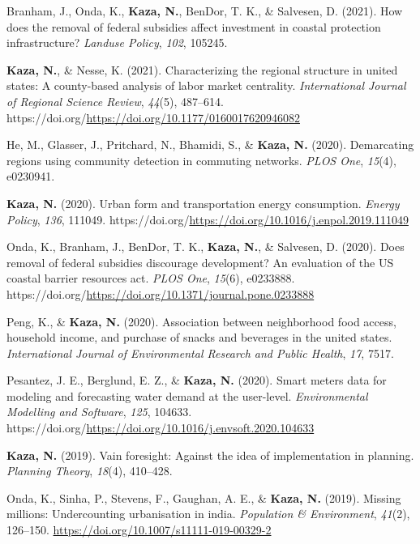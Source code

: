 \documentclass[11pt,a4paper,]{awesome-cv}
\newlength{\cslhangindent}
\newenvironment{CSLReferences}[2] %
 {\begin{list}{}{%
  \setlength{\itemindent}{0pt}
  \setlength{\leftmargin}{0pt}
  \setlength{\parsep}{0pt}
  \ifodd #1
   \setlength{\leftmargin}{\cslhangindent}
   \setlength{\itemindent}{-1\cslhangindent}
  \fi
  \setlength{\itemsep}{#2\baselineskip}}}
 {\end{list}}
\begin{document}
\begin{CSLReferences}{1}{0}
Branham, J., Onda, K., \textbf{Kaza, N.}, BenDor, T. K., \& Salvesen, D.
(2021). How does the removal of federal subsidies affect investment in
coastal protection infrastructure? \emph{Landuse Policy}, \emph{102},
105245.

\textbf{Kaza, N.}, \& Nesse, K. (2021). Characterizing the regional
structure in united states: A county-based analysis of labor market
centrality. \emph{International Journal of Regional Science Review},
\emph{44}(5), 487--614.
https://doi.org/\url{https://doi.org/10.1177/0160017620946082}

He, M., Glasser, J., Pritchard, N., Bhamidi, S., \& \textbf{Kaza, N.}
(2020). Demarcating regions using community detection in commuting
networks. \emph{PLOS One}, \emph{15}(4), e0230941.

\textbf{Kaza, N.} (2020). Urban form and transportation energy
consumption. \emph{Energy Policy}, \emph{136}, 111049.
https://doi.org/\url{https://doi.org/10.1016/j.enpol.2019.111049}

Onda, K., Branham, J., BenDor, T. K., \textbf{Kaza, N.}, \& Salvesen, D.
(2020). Does removal of federal subsidies discourage development? An
evaluation of the US coastal barrier resources act. \emph{PLOS One},
\emph{15}(6), e0233888.
https://doi.org/\url{https://doi.org/10.1371/journal.pone.0233888}

Peng, K., \& \textbf{Kaza, N.} (2020). Association between neighborhood
food access, household income, and purchase of snacks and beverages in
the united states. \emph{International Journal of Environmental Research
and Public Health}, \emph{17}, 7517.

Pesantez, J. E., Berglund, E. Z., \& \textbf{Kaza, N.} (2020). Smart
meters data for modeling and forecasting water demand at the user-level.
\emph{Environmental Modelling and Software}, \emph{125}, 104633.
https://doi.org/\url{https://doi.org/10.1016/j.envsoft.2020.104633}

\textbf{Kaza, N.} (2019). Vain foresight: Against the idea of
implementation in planning. \emph{Planning Theory}, \emph{18}(4),
410--428.

Onda, K., Sinha, P., Stevens, F., Gaughan, A. E., \& \textbf{Kaza, N.}
(2019). Missing millions: Undercounting urbanisation in india.
\emph{Population \& Environment}, \emph{41}(2), 126--150.
\url{https://doi.org/10.1007/s11111-019-00329-2}


\end{CSLReferences}
\end{document}
